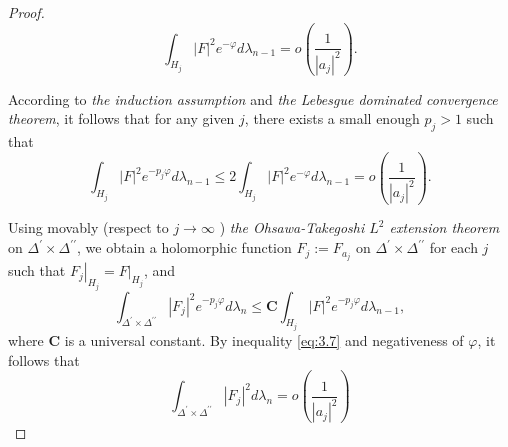 \begin{proof}
\begin{equation}\label{eq:convergence}
    \int_{H_j}|F|^2 e^{-\varphi} d \lambda_{n-1}=o\left(\frac{1}{\left|a_j\right|^2}\right) .
\end{equation}


According to \textit{the induction assumption} and \textit{the Lebesgue dominated convergence theorem}, it follows that for any given $j$, there exists a small enough $p_j>1$ such that
\begin{equation}\label{eq:3.7}
    \int_{H_j}|F|^2 e^{-p_j \varphi} d \lambda_{n-1} \leq 2 \int_{H_j}|F|^2 e^{-\varphi} d \lambda_{n-1}=o\left(\frac{1}{\left|a_j\right|^2}\right) .
\end{equation}

Using movably (respect to $j \rightarrow \infty$ ) \textit{the Ohsawa-Takegoshi $L^2$ extension theorem} on $\Delta^{\prime} \times \Delta^{\prime \prime}$, we obtain a holomorphic function $F_j:=F_{a_j}$ on $\Delta^{\prime} \times \Delta^{\prime \prime}$ for each $j$ such that $\left.F_j\right|_{H_j}=\left.F\right|_{H_j}$, and
$$
\int_{\Delta^{\prime} \times \Delta^{\prime \prime}}\left|F_j\right|^2 e^{-p_j \varphi} d \lambda_n \leq \mathbf{C} \int_{H_j}|F|^2 e^{-p_j \varphi} d \lambda_{n-1},
$$
where $\mathbf{C}$ is a universal constant.
By inequality \eqref{eq:3.7} and negativeness of $\varphi$, it follows that
\begin{equation}\label{eq:3.8}
    \int_{\Delta^{\prime} \times \Delta^{\prime \prime}}\left|F_j\right|^2 d \lambda_n=o\left(\frac{1}{\left|a_j\right|^2}\right)
\end{equation}


\end{proof}
